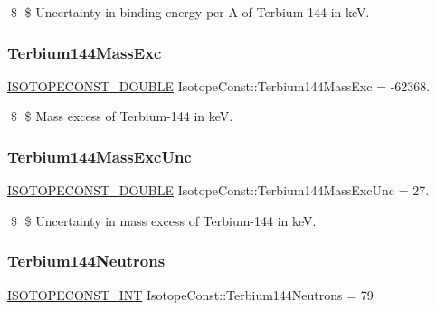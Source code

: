\$ \$ Uncertainty in binding energy per A of Terbium-\/144 in keV. \mbox{\label{group___isotope_const-_terbium-_tb144_gab5dff5faa9065b7192ab4870395cb566}} 
\subsubsection{\texorpdfstring{Terbium144\+Mass\+Exc}{Terbium144MassExc}}
{\footnotesize\ttfamily \mbox{\hyperlink{group___isotope_const-_macros_ga8f45a7272ce02c0b4c65c44636ed719a}{I\+S\+O\+T\+O\+P\+E\+C\+O\+N\+S\+T\+\_\+\+D\+O\+U\+B\+LE}} Isotope\+Const\+::\+Terbium144\+Mass\+Exc = -\/62368.}

\$ \$ Mass excess of Terbium-\/144 in keV. \mbox{\label{group___isotope_const-_terbium-_tb144_ga764e725c2a7c30553aa75b1d88a6da64}} 
\subsubsection{\texorpdfstring{Terbium144\+Mass\+Exc\+Unc}{Terbium144MassExcUnc}}
{\footnotesize\ttfamily \mbox{\hyperlink{group___isotope_const-_macros_ga8f45a7272ce02c0b4c65c44636ed719a}{I\+S\+O\+T\+O\+P\+E\+C\+O\+N\+S\+T\+\_\+\+D\+O\+U\+B\+LE}} Isotope\+Const\+::\+Terbium144\+Mass\+Exc\+Unc = 27.}

\$ \$ Uncertainty in mass excess of Terbium-\/144 in keV. \mbox{\label{group___isotope_const-_terbium-_tb144_gab1ad33d24ca5d54f58623f222deeb4ca}} 
\subsubsection{\texorpdfstring{Terbium144\+Neutrons}{Terbium144Neutrons}}
{\footnotesize\ttfamily \mbox{\hyperlink{group___isotope_const-_macros_ga5f18360b3e99483a35c32d789e62621c}{I\+S\+O\+T\+O\+P\+E\+C\+O\+N\+S\+T\+\_\+\+I\+NT}} Isotope\+Const\+::\+Terbium144\+Neutrons = 79}

